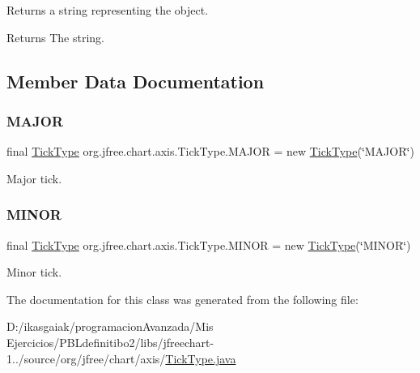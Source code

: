 Returns a string representing the object.

\begin{DoxyReturn}{Returns}
The string. 
\end{DoxyReturn}


\subsection{Member Data Documentation}
\mbox{\label{classorg_1_1jfree_1_1chart_1_1axis_1_1_tick_type_a415a9fea96014a917943ee8d0e321986}} 
\subsubsection{\texorpdfstring{M\+A\+J\+OR}{MAJOR}}
{\footnotesize\ttfamily final \mbox{\hyperlink{classorg_1_1jfree_1_1chart_1_1axis_1_1_tick_type}{Tick\+Type}} org.\+jfree.\+chart.\+axis.\+Tick\+Type.\+M\+A\+J\+OR = new \mbox{\hyperlink{classorg_1_1jfree_1_1chart_1_1axis_1_1_tick_type}{Tick\+Type}}(\char`\"{}M\+A\+J\+OR\char`\"{})\hspace{0.3cm}{\ttfamily [static]}}

Major tick. \mbox{\label{classorg_1_1jfree_1_1chart_1_1axis_1_1_tick_type_acd4c166051e42164c9ab936fbd7b80e9}} 
\subsubsection{\texorpdfstring{M\+I\+N\+OR}{MINOR}}
{\footnotesize\ttfamily final \mbox{\hyperlink{classorg_1_1jfree_1_1chart_1_1axis_1_1_tick_type}{Tick\+Type}} org.\+jfree.\+chart.\+axis.\+Tick\+Type.\+M\+I\+N\+OR = new \mbox{\hyperlink{classorg_1_1jfree_1_1chart_1_1axis_1_1_tick_type}{Tick\+Type}}(\char`\"{}M\+I\+N\+OR\char`\"{})\hspace{0.3cm}{\ttfamily [static]}}

Minor tick. 

The documentation for this class was generated from the following file\+:\begin{DoxyCompactItemize}
\item 
D\+:/ikasgaiak/programacion\+Avanzada/\+Mis Ejercicios/\+P\+B\+Ldefinitibo2/libs/jfreechart-\/1../source/org/jfree/chart/axis/\mbox{\hyperlink{_tick_type_8java}{Tick\+Type.\+java}}\end{DoxyCompactItemize}
